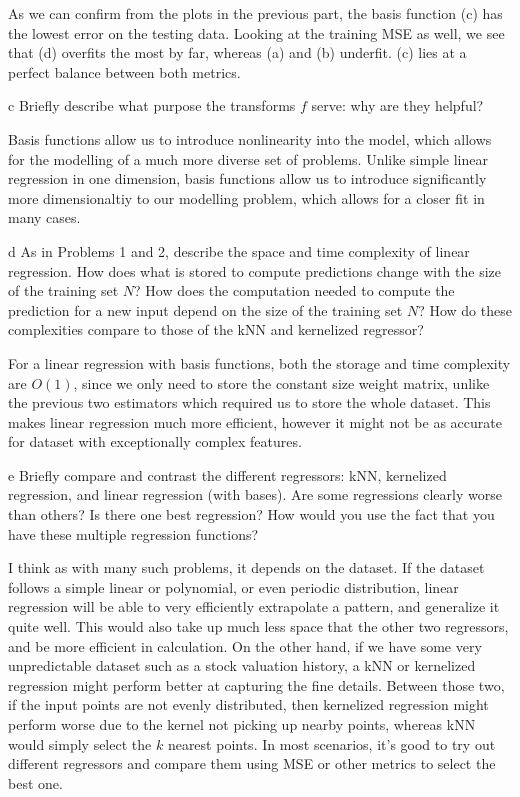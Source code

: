 \documentclass[expanded]{lkx_pset}
\begin{document}
\begin{parts}
  As we can confirm from the plots in the previous part, the basis function (c) has the lowest error on the testing data. Looking at the training MSE as well, we see that (d) overfits the most by far, whereas (a) and (b) underfit. (c) lies at a perfect balance between both metrics.

  \begin{part}{c}
    Briefly describe what purpose the transforms $f$ serve: why are they helpful?
  \end{part}

  Basis functions allow us to introduce nonlinearity into the model, which allows for the modelling of a much more diverse set of problems. Unlike simple linear regression in one dimension, basis functions allow us to introduce significantly more dimensionaltiy to our modelling problem, which allows for a closer fit in many cases.

  \begin{part}{d}
    As in Problems 1 and 2, describe the space and time complexity of linear regression.  How does what is stored to compute predictions change with the size of the training set $N$?  How does the computation needed to compute the prediction for a new input depend on the size of the training set $N$?  How do these complexities compare to those of the kNN and kernelized regressor?
  \end{part}

  For a linear regression with basis functions, both the storage and time complexity are $O(1)$, since we only need to store the constant size weight matrix, unlike the previous two estimators which required us to store the whole dataset. This makes linear regression much more efficient, however it might not be as accurate for dataset with exceptionally complex features.

  \begin{part}{e}
    Briefly compare and contrast the different regressors: kNN,
    kernelized regression, and linear regression (with bases).  Are some
    regressions clearly worse than others?  Is there one best
    regression?  How would you use the fact that you have these multiple
    regression functions?
  \end{part}

  I think as with many such problems, it depends on the dataset. If the dataset follows a simple linear or polynomial, or even periodic distribution, linear regression will be able to very efficiently extrapolate a pattern, and generalize it quite well. This would also take up much less space that the other two regressors, and be more efficient in calculation. On the other hand, if we have some very unpredictable dataset such as a stock valuation history, a kNN or kernelized regression might perform better at capturing the fine details. Between those two, if the input points are not evenly distributed, then kernelized regression might perform worse due to the kernel not picking up nearby points, whereas kNN would simply select the $k$ nearest points. In most scenarios, it's good to try out different regressors and compare them using MSE or other metrics to select the best one.
\end{parts}
\end{document}
